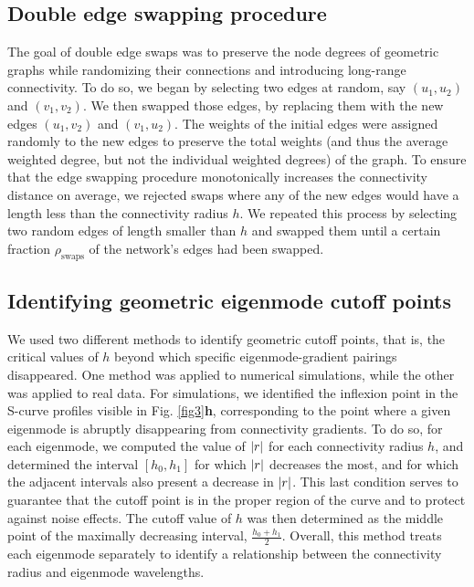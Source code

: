 \documentclass{article}
\begin{document}
\subsection*{Double edge swapping procedure}

The goal of double edge swaps was to preserve the node degrees of geometric graphs while randomizing their connections and introducing long-range connectivity. To do so, we began by selecting two edges at random, say $(u_1, u_2)$ and $(v_1, v_2)$. We then swapped those edges, by replacing them with the new edges $(u_1, v_2)$ and $(v_1, u_2)$. The weights of the initial edges were assigned randomly to the new edges to preserve the total weights (and thus the average weighted degree, but not the individual weighted degrees) of the graph. To ensure that the edge swapping procedure monotonically increases the connectivity distance on average, we rejected swaps where any of the new edges would have a length less than the connectivity radius $h$. We repeated this process by selecting two random edges of length smaller than $h$ and swapped them until a certain fraction $\rho_\text{swaps}$ of the network's edges had been swapped.

\subsection*{Identifying geometric eigenmode cutoff points}

We used two different methods to identify geometric cutoff points, that is, the critical values of $h$ beyond which specific eigenmode-gradient pairings disappeared. One method was applied to numerical simulations, while the other was applied to real data. For simulations, we identified the inflexion point in the S-curve profiles visible in Fig. \ref{fig3}\textbf{h}, corresponding to the point where a given eigenmode is abruptly disappearing from connectivity gradients. To do so, for each eigenmode, we computed the value of $\abs{r}$ for each connectivity radius $h$, and determined the interval $[h_0, h_1]$ for which $\abs{r}$ decreases the most, and for which the adjacent intervals also present a decrease in $\abs{r}$. This last condition serves to guarantee that the cutoff point is in the proper region of the curve and to protect against noise effects. The cutoff value of $h$ was then determined as the middle point of the maximally decreasing interval, $\frac{h_0 + h_1}{2}$. Overall, this method treats each eigenmode separately to identify a relationship between the connectivity radius and eigenmode wavelengths.
\end{document}

